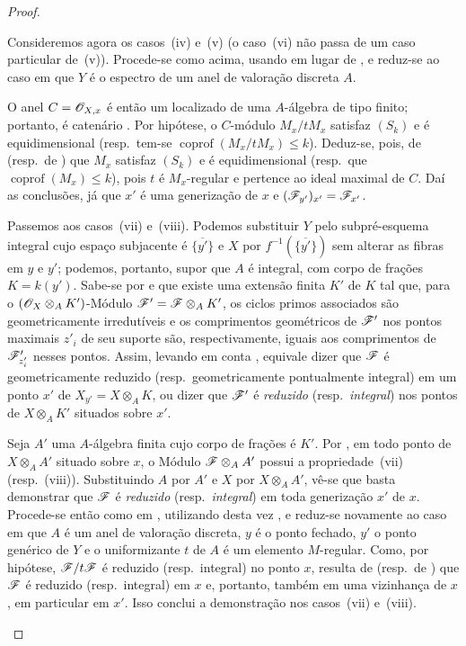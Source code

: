 \begin{proof}
\begin{env}[12.1.1.2]
\label{IV.12.1.1.2}
Consideremos agora os casos~(iv) e~(v) (o caso~(vi) não passa de
um caso particular de~(v)). Procede-se como acima, usando
 em lugar de , e reduz-se ao caso
em que $Y$ é o espectro de um anel de valoração discreta $A$.

O anel $C=\mathscr{O}_{X,x}$ é então um localizado de uma
$A$-álgebra de tipo finito; portanto, é catenário
. Por hipótese, o $C$-módulo $M_x/tM_x$
satisfaz $(S_k)$ e é equidimensional (resp.\ tem-se
$\operatorname{coprof}(M_x/tM_x)\leq k$). Deduz-se, pois, de
 (resp.\ de ) que $M_x$
satisfaz $(S_k)$ e é equidimensional (resp.\ que
$\operatorname{coprof}(M_x)\leq k$), pois $t$ é $M_x$-regular
e pertence ao ideal maximal de $C$. Daí as conclusões, já que
$x'$ é uma generização de $x$ e
$(\mathscr{F}_{y'})_{x'}=\mathscr{F}_{x'}$.
\end{env}

\begin{env}[12.1.1.3]
\label{IV.12.1.1.3}
Passemos aos casos~(vii) e~(viii). Podemos substituir $Y$ pelo
subpré-esquema integral cujo espaço subjacente é
$\overline{\{y'\}}$ e $X$ por
$f^{-1}(\overline{\{y'\}})$ sem alterar as fibras em $y$ e
$y'$; podemos, portanto, supor que $A$ é integral, com corpo
de frações $K=k(y')$. Sabe-se por  e
 que existe uma extensão finita $K'$ de $K$
tal que, para o $(\mathscr{O}_X\otimes_A K')$-Módulo
$\mathscr{F}'=\mathscr{F}\otimes_A K'$, os ciclos primos associados
são geometricamente irredutíveis e os comprimentos geométricos
de $\mathscr{F}'$ nos pontos maximais $z'_i$ de seu suporte são,
respectivamente, iguais aos comprimentos de
$\mathscr{F}'_{z'_i}$ nesses pontos. Assim, levando em conta
, equivale dizer que $\mathscr{F}$ é
geometricamente reduzido (resp.\ geometricamente
pontualmente integral) em um ponto $x'$ de
$X_{y'}=X\otimes_A K$, ou dizer que $\mathscr{F}'$ é
\emph{reduzido} (resp.\ \emph{integral}) nos pontos de
$X\otimes_A K'$ situados sobre $x'$.

Seja $A'$ uma $A$-álgebra finita cujo corpo de frações é
$K'$. Por , em todo ponto de
$X\otimes_A A'$ situado sobre $x$, o Módulo
$\mathscr{F}\otimes_A A'$ possui a propriedade~(vii)
(resp.~(viii)). Substituindo $A$ por $A'$ e $X$ por
$X\otimes_A A'$, vê-se que basta demonstrar que $\mathscr{F}$
é \emph{reduzido} (resp.\ \emph{integral}) em toda generização
$x'$ de $x$. Procede-se então como em
, utilizando desta vez
, e reduz-se novamente ao caso em que $A$
é um anel de valoração discreta, $y$ é o ponto fechado,
$y'$ o ponto genérico de $Y$ e o uniformizante $t$ de $A$
é um elemento $M$-regular. Como, por hipótese,
$\mathscr{F}/t\mathscr{F}$ é reduzido (resp.\ integral) no ponto $x$,
resulta de  (resp.\ de
) que $\mathscr{F}$ é reduzido (resp.\ integral)
em $x$ e, portanto, também em uma vizinhança de $x$,
em particular em $x'$. Isso conclui a demonstração nos
casos~(vii) e~(viii).
\end{env}


\end{proof}
